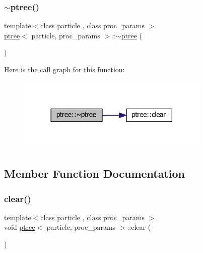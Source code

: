 \hypertarget{classptree_a7f4dd129764d06800dbadb91ed88a62c}{}\label{classptree_a7f4dd129764d06800dbadb91ed88a62c} 
\subsubsection{\texorpdfstring{$\sim$ptree()}{~ptree()}}
{\footnotesize\ttfamily template$<$class particle , class proc\+\_\+params $>$ \\
\hyperlink{classptree}{ptree}$<$ particle, proc\+\_\+params $>$\+::$\sim$\hyperlink{classptree}{ptree} (\begin{DoxyParamCaption}{ }\end{DoxyParamCaption})\hspace{0.3cm}{\ttfamily [inline]}}

Here is the call graph for this function\+:
\nopagebreak
\begin{figure}[H]
\begin{center}
\leavevmode
\includegraphics[width=260pt]{classptree_a7f4dd129764d06800dbadb91ed88a62c_cgraph}
\end{center}
\end{figure}


\subsection{Member Function Documentation}
\hypertarget{classptree_aa7b4caa59ef84eca62433a9621dcfb1b}{}\label{classptree_aa7b4caa59ef84eca62433a9621dcfb1b} 
\subsubsection{\texorpdfstring{clear()}{clear()}}
{\footnotesize\ttfamily template$<$class particle , class proc\+\_\+params $>$ \\
void \hyperlink{classptree}{ptree}$<$ particle, proc\+\_\+params $>$\+::clear (\begin{DoxyParamCaption}{ }\end{DoxyParamCaption})\hspace{0.3cm}{\ttfamily [inline]}}


